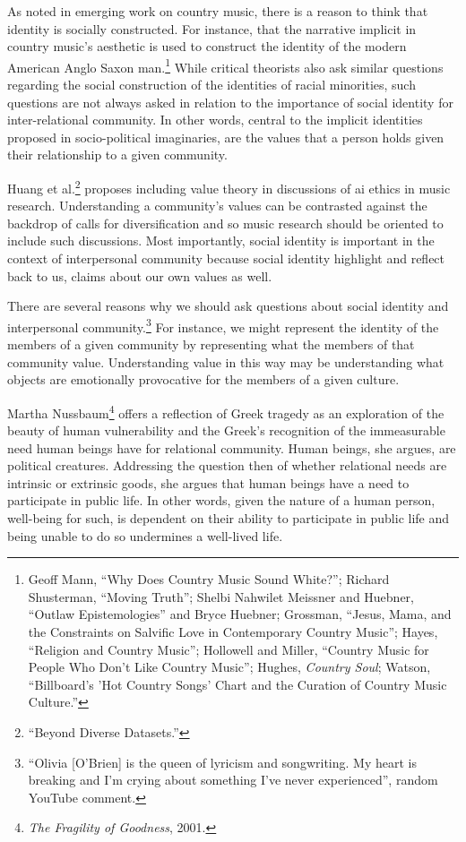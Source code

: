\documentclass[
  12pt,
]{book}
\theoremstyle{definition}
\theoremstyle{definition}
\theoremstyle{definition}
\theoremstyle{definition}
\theoremstyle{remark}
\begin{document}
As noted in emerging work on country music, there is a reason to think that identity is socially constructed. For instance, that the narrative implicit in country music's aesthetic is used to construct the identity of the modern American Anglo Saxon man.\footnote{Geoff Mann, {``Why Does Country Music Sound White?''}; Richard Shusterman, {``Moving {Truth}''}; Shelbi Nahwilet Meissner and Huebner, {``Outlaw Epistemologies''} and Bryce Huebner; Grossman, {``Jesus, {Mama}, and the {Constraints} on {Salvific Love} in {Contemporary Country Music}''}; Hayes, {``Religion and {Country Music}''}; Hollowell and Miller, {``Country {Music} for {People Who Don}'t {Like Country Music}''}; Hughes, \emph{Country Soul}; Watson, {``Billboard's '{Hot Country Songs}' Chart and the Curation of Country Music Culture.''}} While critical theorists also ask similar questions regarding the social construction of the identities of racial minorities, such questions are not always asked in relation to the importance of social identity for inter-relational community. In other words, central to the implicit identities proposed in socio-political imaginaries, are the values that a person holds given their relationship to a given community.

Huang et al.\footnote{{``Beyond {Diverse Datasets}.''}} proposes including value theory in discussions of ai ethics in music research. Understanding a community's values can be contrasted against the backdrop of calls for diversification and so music research should be oriented to include such discussions. Most importantly, social identity is important in the context of interpersonal community because social identity highlight and reflect back to us, claims about our own values as well.

There are several reasons why we should ask questions about social identity and interpersonal community.\footnote{``Olivia {[}O'Brien{]} is the queen of lyricism and songwriting. My heart is breaking and I'm crying about something I've never experienced'', random YouTube comment.} For instance, we might represent the identity of the members of a given community by representing what the members of that community value. Understanding value in this way may be understanding what objects are emotionally provocative for the members of a given culture.

Martha Nussbaum\footnote{\emph{The {Fragility} of {Goodness}}, 2001.} offers a reflection of Greek tragedy as an exploration of the beauty of human vulnerability and the Greek's recognition of the immeasurable need human beings have for relational community. Human beings, she argues, are political creatures. Addressing the question then of whether relational needs are intrinsic or extrinsic goods, she argues that human beings have a need to participate in public life. In other words, given the nature of a human person, well-being for such, is dependent on their ability to participate in public life and being unable to do so undermines a well-lived life.
\end{document}
